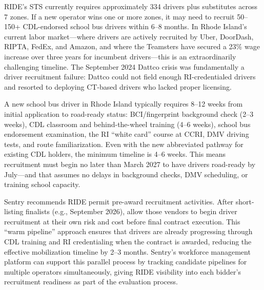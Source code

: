 \begin{description}[style=nextline, leftmargin=0.5cm]
    \item[\faIcon{users} \textbf{Scale of Recruitment Challenge:}] RIDE's STS currently requires approximately 334 drivers plus substitutes across 7 zones. If a new operator wins one or more zones, it may need to recruit 50--150+ CDL-endorsed school bus drivers within 6--8 months. In Rhode Island's current labor market---where drivers are actively recruited by Uber, DoorDash, RIPTA, FedEx, and Amazon, and where the Teamsters have secured a 23\% wage increase over three years for incumbent drivers---this is an extraordinarily challenging timeline. The September 2024 Dattco crisis was fundamentally a driver recruitment failure: Dattco could not field enough RI-credentialed drivers and resorted to deploying CT-based drivers who lacked proper licensing.

    \item[\faIcon{clock} \textbf{CDL Training Timeline:}] A new school bus driver in Rhode Island typically requires 8--12 weeks from initial application to road-ready status: BCI/fingerprint background check (2--3 weeks), CDL classroom and behind-the-wheel training (4--6 weeks), school bus endorsement examination, the RI ``white card'' course at CCRI, DMV driving tests, and route familiarization. Even with the new abbreviated pathway for existing CDL holders, the minimum timeline is 4--6 weeks. This means recruitment must begin no later than March 2027 to have drivers road-ready by July---and that assumes no delays in background checks, DMV scheduling, or training school capacity.

    \item[\faIcon{lightbulb} \textbf{Sentry's Recommendation:}] Sentry recommends RIDE permit pre-award recruitment activities. After short-listing finalists (e.g., September 2026), allow those vendors to begin driver recruitment at their own risk and cost before final contract execution. This ``warm pipeline'' approach ensures that drivers are already progressing through CDL training and RI credentialing when the contract is awarded, reducing the effective mobilization timeline by 2--3 months. Sentry's workforce management platform can support this parallel process by tracking candidate pipelines for multiple operators simultaneously, giving RIDE visibility into each bidder's recruitment readiness as part of the evaluation process.
\end{description}

